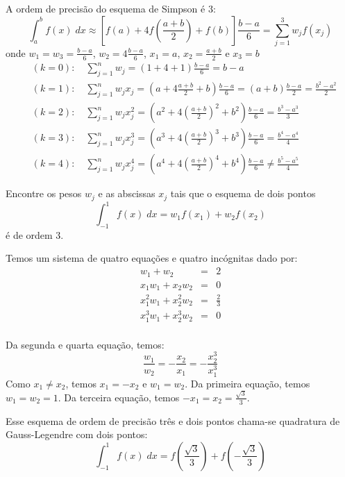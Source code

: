\begin{ex}
A ordem de precisão do esquema de Simpson é 3:
\begin{equation} \int_a^b f(x)\;dx \approx \left[f(a)+4f\left(\frac{a+b}{2}\right)+f(b)\right]\frac{b-a}{6}=\sum_{j=1}^3w_jf(x_j) \end{equation}
onde $w_1=w_3=\frac{b-a}{6}$, $w_2=4\frac{b-a}{6}$, $x_1=a$, $x_2=\frac{a+b}{2}$ e $x_3=b$
\begin{eqnarray}
  &(k=0):\quad\sum_{j=1}^n w_j = (1+4+1)\frac{b-a}{6}=b-a\\
  &(k=1):\quad\sum_{j=1}^n w_jx_j = (a+4\frac{a+b}{2}+b)\frac{b-a}{6} = (a+b)\frac{b-a}{2} = \frac{b^2-a^2}{2}\\
  &(k=2):\quad\sum_{j=1}^n w_jx_j^2 = (a^2+4\left(\frac{a+b}{2}\right)^2+b^2)\frac{b-a}{6} = \frac{b^3-a^3}{3}\\
  &(k=3):\quad\sum_{j=1}^n w_jx_j^3 = (a^3+4\left(\frac{a+b}{2}\right)^3+b^3)\frac{b-a}{6}= \frac{b^4-a^4}{4}\\
  &(k=4):\quad\sum_{j=1}^n w_jx_j^4 = (a^4+4\left(\frac{a+b}{2}\right)^4+b^4)\frac{b-a}{6}\neq \frac{b^5-a^5}{4}
\end{eqnarray}
\end{ex}

\begin{ex}
Encontre os pesos $w_j$ e as abscissas $x_j$ tais que o esquema de dois pontos
\begin{equation} \int_{-1}^1 f(x)\;dx = w_1f(x_1)+w_2f(x_2) \end{equation}
é de ordem 3.
\end{ex}
\begin{sol}
  Temos um sistema de quatro equações e quatro incógnitas dado por:
\begin{eqnarray}
w_1+w_2&=&2\\
x_1w_1+x_2w_2&=&0\\
x_1^2w_1+x_2^2w_2&=&\frac{2}{3}\\
x_1^3w_1+x_2^3w_2&=&0\\
\end{eqnarray}

Da segunda e quarta equação, temos:
\begin{equation} \frac{w_1}{w_2}=-\frac{x_2}{x_1}=-\frac{x_2^3}{x_1^3} \end{equation}
Como $x_1\neq x_2$, temos $x_1=-x_2$ e $w_1=w_2$. Da primeira equação, temos $w_1=w_2=1$. Da terceira equação, temos $-x_1=x_2=\frac{\sqrt{3}}{3}$.

Esse esquema de ordem de precisão três e dois pontos chama-se quadratura de Gauss-Legendre com dois pontos:
\begin{equation} \int_{-1}^1 f(x)\;dx = f\left(\frac{\sqrt{3}}{3}\right)+f\left(-\frac{\sqrt{3}}{3}\right) \end{equation}
\end{sol}

